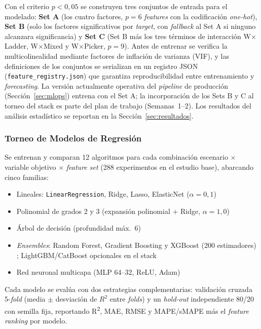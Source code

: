 \documentclass[conference]{IEEEtran}
\begin{document}
Con el criterio $p < 0{,}05$ se construyen tres conjuntos de entrada para el modelado: \textbf{Set A} (los cuatro factores, $p=6$ \textit{features} con la codificación \textit{one-hot}), \textbf{Set B} (solo los factores significativos por \textit{target}, con \textit{fallback} al Set A si ninguno alcanzara significancia) y \textbf{Set C} (Set B más los tres términos de interacción W$\times$Ladder, W$\times$Mixed y W$\times$Picker, $p=9$). Antes de entrenar se verifica la multicolinealidad mediante factores de inflación de varianza (VIF), y las definiciones de los conjuntos se serializan en un registro JSON (\texttt{feature\_registry.json}) que garantiza reproducibilidad entre entrenamiento y \textit{forecasting}. La versión actualmente operativa del \textit{pipeline} de producción (Sección~\ref{sec:mlops}) entrena con el Set A; la incorporación de los Sets B y C al torneo del stack es parte del plan de trabajo (Semanas~1--2). Los resultados del análisis estadístico se reportan en la Sección~\ref{sec:resultados}.

\subsubsection{Torneo de Modelos de Regresión}

Se entrenan y comparan 12 algoritmos para cada combinación escenario $\times$ variable objetivo $\times$ \textit{feature set} (288 experimentos en el estudio base), abarcando cinco familias:

\begin{itemize}
    \item Lineales: \texttt{LinearRegression}, Ridge, Lasso, ElasticNet ($\alpha=0{,}1$)
    \item Polinomial de grados 2 y 3 (expansión polinomial + Ridge, $\alpha=1{,}0$)
    \item Árbol de decisión (profundidad máx.\ 6)
    \item \textit{Ensembles}: Random Forest, Gradient Boosting y XGBoost (200 estimadores) \cite{arunkumar2025,sharma2023}; LightGBM/CatBoost opcionales en el stack
    \item Red neuronal multicapa (MLP 64--32, ReLU, Adam) \cite{ejss2025}
\end{itemize}

Cada modelo se evalúa con dos estrategias complementarias: validación cruzada 5-\textit{fold} (media $\pm$ desviación de $R^2$ entre \textit{folds}) y un \textit{hold-out} independiente 80/20 con semilla fija, reportando R\textsuperscript{2}, MAE, RMSE y MAPE/sMAPE más el \textit{feature ranking} por modelo.
\end{document}
